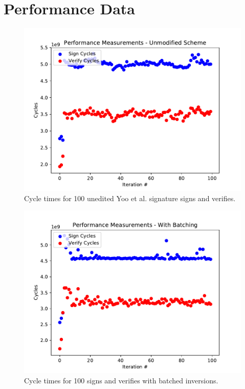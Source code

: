 \chapter{Performance Data}
\label{app:perfdata}

\begin{figure}
\includegraphics{vanilla-cycles.pdf}
\caption{Cycle times for 100 unedited Yoo et al. signature signs and verifies.}
\label{fig:vanillacyclesgraph}
\end{figure}

\begin{figure}
\includegraphics{batched-cycles.pdf}
\caption{Cycle times for 100 signs and verifies with batched inversions.}
\label{fig:batchedcyclesgraph}
\end{figure}

